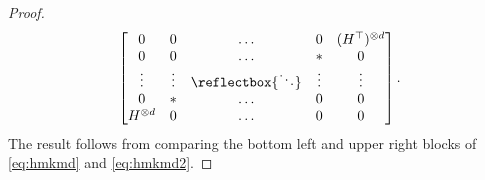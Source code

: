 \documentclass{article}
\providecommand{\iddots}{\mathinner{\reflectbox{\ensuremath{\ddots}}}}
\begin{document}
\begin{proof}
\begin{equation}
        \begin{bmatrix} 
            0 & 0 & \ldots & 0 & (H^\top)^{\otimes d}\\
            0 & 0 & \ldots & * & 0\\
            \vdots & \vdots & \iddots & \vdots & \vdots \\
            0 & * & \ldots & 0 & 0\\
            H^{\otimes d} & 0 & \ldots & 0 & 0
        \end{bmatrix}.
        \label{eq:hmkmd2}
    \end{equation}
    The result follows from
    comparing the bottom left and upper right blocks of \eqref{eq:hmkmd} and \eqref{eq:hmkmd2}.
\end{proof}
\end{document}
